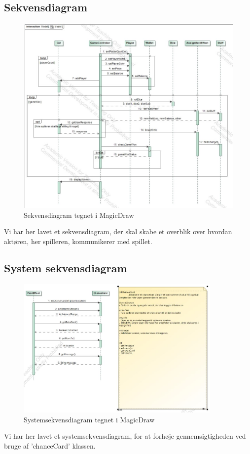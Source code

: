     \subsection{Sekvensdiagram}
        \begin{figure}[h]
            \advance{}
            \includegraphics[width=12cm]{fig/Sekvensdiagram(1).jpg}
            \caption{Sekvensdiagram tegnet i MagicDraw}
        \end{figure} 
    Vi har her lavet et sekvensdiagram, der skal skabe et overblik over hvordan aktøren, her spilleren,
    kommunikerer med spillet.
\pagebreak
    
    \subsection{System sekvensdiagram}   
        \begin{figure}[h]
            \includegraphics[width=10cm]{fig/SSD.jpg}
            \caption{Systemsekvensdiagram tegnet i MagicDraw}
        \end{figure}
    Vi har her lavet et systemsekvensdiagram, for at forhøje gennemsigtigheden ved bruge af
    'chanceCard' klassen.
\pagebreak
    
